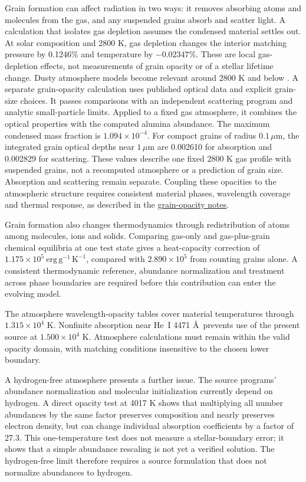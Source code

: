 \documentclass[11pt,letterpaper]{article}
\newcommand{\doc}[2]{\href{https://github.com/oklo/ember/blob/codex/atmosphere5000-density-checks/#1}{#2}}
\begin{document}
Grain formation can affect radiation in two ways: it removes absorbing atoms
and molecules from the gas, and any suspended grains absorb and scatter light.
A calculation that isolates gas depletion assumes the condensed material
settles out. At solar composition and 2800 K, gas depletion changes the
interior matching pressure by 0.1246\% and temperature by $-0.02347\%$.
These are local gas-depletion effects, not measurements of grain opacity or
of a stellar lifetime change. Dusty atmosphere models become relevant around
2800 K and below \cite{chabrier00}. A separate grain-opacity calculation uses published optical data and explicit
grain-size choices. It passes comparisons with an independent scattering program
and analytic small-particle limits. Applied to a fixed gas atmosphere, it
combines the optical properties with the computed alumina abundance. The maximum condensed mass fraction is
$1.094\times10^{-4}$. For compact grains of radius $0.1\,\mu\mathrm{m}$,
the integrated grain optical depths near $1\,\mu\mathrm{m}$ are 0.002610
for absorption and 0.002829 for scattering. These values describe one fixed
2800 K gas profile with suspended grains, not a recomputed atmosphere or a
prediction of grain size. Absorption and scattering remain separate. Coupling these opacities to the atmospheric structure requires consistent
material phases, wavelength coverage and thermal response, as described in the
\doc{docs/GRAINS.md}{grain-opacity notes}.

Grain formation also changes thermodynamics through redistribution of atoms
among molecules, ions and solids. Comparing gas-only and gas-plus-grain
chemical equilibria at one test state gives a heat-capacity correction of
$1.175\times10^5\ \mathrm{erg\,g^{-1}\,K^{-1}}$, compared with
$2.890\times10^5$ from counting grains alone. A consistent thermodynamic
reference, abundance normalization and treatment across phase boundaries are
required before this contribution can enter the evolving model.

The atmosphere wavelength-opacity tables cover material temperatures through
$1.315\times10^4$ K. Nonfinite absorption near He~I 4471 \AA\ prevents use
of the present source at $1.500\times10^4$ K. Atmosphere calculations must
remain within the valid opacity domain, with matching conditions insensitive
to the chosen lower boundary.

A hydrogen-free atmosphere presents a further issue. The source programs'
abundance normalization and molecular initialization currently depend on
hydrogen. A direct opacity test at 4017 K shows that multiplying all number
abundances by the same factor preserves composition and nearly preserves
electron density, but can change individual absorption coefficients by a
factor of 27.3. This one-temperature test does not measure a stellar-boundary
error; it shows that a simple abundance rescaling is not yet a verified solution.
The hydrogen-free limit therefore requires a source formulation that does not
normalize abundances to hydrogen.
\end{document}

